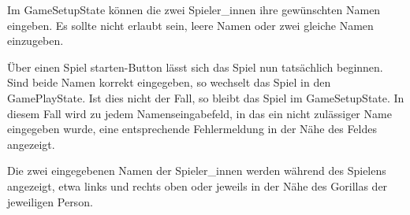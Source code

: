 Im GameSetupState können die zwei Spieler\_innen ihre gewünschten Namen eingeben. Es sollte nicht erlaubt sein, leere Namen oder zwei gleiche Namen einzugeben.

Über einen \glqq{}Spiel starten\grqq{}-Button lässt sich das Spiel nun tatsächlich beginnen. Sind beide Namen korrekt eingegeben, so wechselt das Spiel in den GamePlayState. Ist dies nicht der Fall, so bleibt das Spiel im GameSetupState. In diesem Fall wird zu jedem Namenseingabefeld, in das ein nicht zulässiger Name eingegeben wurde, eine entsprechende Fehlermeldung in der Nähe des Feldes angezeigt.

Die zwei eingegebenen Namen der Spieler\_innen werden während des Spielens angezeigt, etwa links und rechts oben oder jeweils in der Nähe des Gorillas der jeweiligen Person.